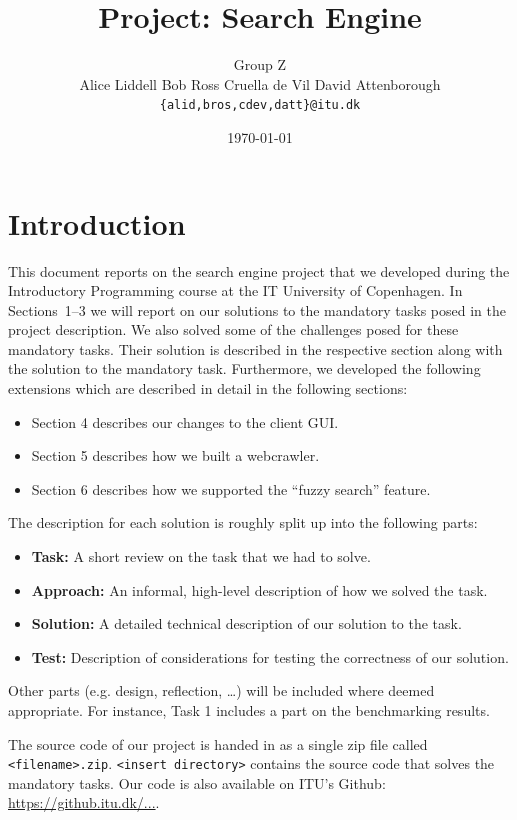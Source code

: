 \documentclass[11pt]{article}
\title{Project: Search Engine}
\author{{\Large Group Z}\\Alice Liddell \quad Bob Ross \quad Cruella de Vil \quad David Attenborough\\\tt{\{alid,bros,cdev,datt\}@itu.dk}}
\date{\today{}}
\begin{document}
\maketitle

\section*{Introduction}
%
This document reports on the search engine project that we developed
during the Introductory Programming course at the IT University of
Copenhagen.
%
In Sections~1--3 we will report on our solutions to the
mandatory tasks posed in the project description.
%
We also solved some of the challenges posed for these mandatory
tasks.
%
Their solution is described in the respective section along with the
solution to the mandatory task.
%
%
Furthermore, we developed the following extensions which are described
in detail in the following sections:
%
\begin{itemize}
\item
  Section 4 describes our changes to the client GUI.
\item
  Section 5 describes how we built a webcrawler. 
\item
  Section 6 describes how we supported the ``fuzzy search'' feature. 
\end{itemize}

The description for each solution is roughly split up into the
following parts:
%
\begin{itemize}
\item
  \textbf{Task:} A short review on the task that we had to solve.
\item
  \textbf{Approach:} An informal, high-level description of how we solved the
  task.
\item
  \textbf{Solution:} A detailed technical description of our solution to the task.
\item
  \textbf{Test:} Description of considerations for testing the
  correctness of our solution.
\end{itemize}

%
Other parts (e.g. design, reflection, \ldots{}) will be included where
deemed appropriate. For instance, Task 1 includes a part on the
benchmarking results.

%
The source code of our project is handed in as a single
zip file called \texttt{<filename>.zip}.
%
\texttt{<insert directory>} contains the source code that solves the
mandatory tasks.
%
Our code is also available on ITU's Github: 
\url{https://github.itu.dk/...}.
%
\end{document}
